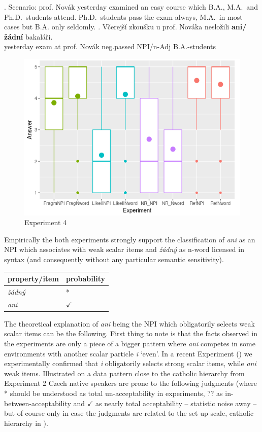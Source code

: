 \documentclass[12pt]{scrartcl}
\begin{document}
\ex. Scenario: prof. Novák yesterday examined an easy course which B.A.,
M.A.~and Ph.D.~students attend. Ph.D.~students pass the exam always,
M.A.~in most cases but B.A. only seldomly. \a. Včerejší zkoušku u prof.
Nováka nesložili \textbf{ani/žádní} bakaláři.\\
yesterday exam at prof. Novák neg.passed NPI/n-Adj B.A.-students

\begin{figure}
\centering
\includegraphics{include/Rplot04.png}
\caption{Experiment 4}
\end{figure}

Empirically the both experiments strongly support the classification of \textit{ani} as an NPI which associates with weak scalar items and \textit{žádný} as n-word licensed in syntax (and consequently without any particular semantic sensitivity).

\begin{longtable}[]{@{}ll@{}}
\toprule
property/item & probability\tabularnewline
\midrule
\endhead
\emph{žádný} & *\tabularnewline
\emph{ani} & \(\checkmark\)\tabularnewline
\bottomrule
\end{longtable}

The theoretical explanation of \textit{ani} being the NPI which obligatorily selects weak scalar items can be the following. First thing to note is that the facts observed in the experiments are only a piece of a bigger pattern where \textit{ani} competes in some environments with another scalar particle \textit{i} `even'. In a recent Experiment (\citealt{docekalsafratovaoli}) we experimentally confirmed that \textit{i} obligatorily selects strong scalar items, while \textit{ani} weak items. Illustrated on a data pattern close to the catholic hierarchy from Experiment 2 Czech native speakers are prone to the following judgments (where * should be understood as total un-acceptability in experiments, ?? as in-between-acceptability and $\checkmark$ as nearly total acceptability -- statistic noise away -- but of course only in case the judgments are related to the set up scale, catholic hierarchy in \Next).
\end{document}
